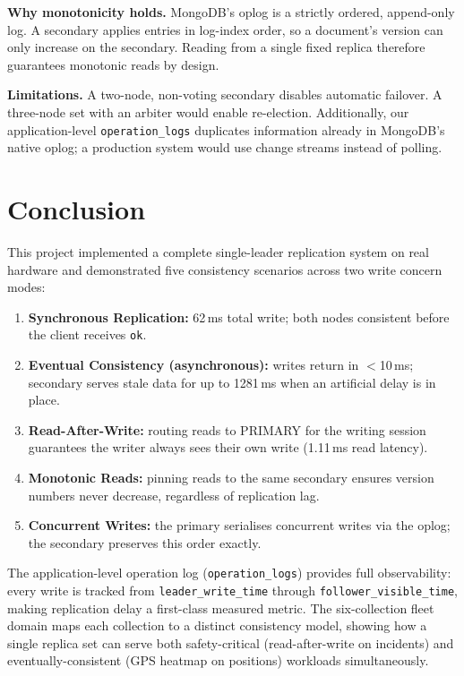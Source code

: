 \documentclass[12pt,a4paper]{article}
\newcommand{\code}[1]{\texttt{\small #1}}
\begin{document}
\textbf{Why monotonicity holds.}
MongoDB's oplog is a strictly ordered, append-only log. A secondary applies entries in
log-index order, so a document's version can only increase on the secondary. Reading
from a single fixed replica therefore guarantees monotonic reads by design.

\textbf{Limitations.}
A two-node, non-voting secondary disables automatic failover. A three-node set with an
arbiter would enable re-election. Additionally, our application-level \code{operation\_logs}
duplicates information already in MongoDB's native oplog; a production system would use
change streams instead of polling.

\section{Conclusion}

This project implemented a complete single-leader replication system on real hardware and
demonstrated five consistency scenarios across two write concern modes:

\begin{enumerate}
  \item \textbf{Synchronous Replication:} 62\,ms total write; both nodes consistent
        before the client receives \code{ok}.
  \item \textbf{Eventual Consistency (asynchronous):} writes return in $<$10\,ms; secondary
        serves stale data for up to 1281\,ms when an artificial delay is in place.
  \item \textbf{Read-After-Write:} routing reads to PRIMARY for the writing session
        guarantees the writer always sees their own write (1.11\,ms read latency).
  \item \textbf{Monotonic Reads:} pinning reads to the same secondary ensures version
        numbers never decrease, regardless of replication lag.
  \item \textbf{Concurrent Writes:} the primary serialises concurrent writes via the
        oplog; the secondary preserves this order exactly.
\end{enumerate}

The application-level operation log (\code{operation\_logs}) provides full observability:
every write is tracked from \code{leader\_write\_time} through
\code{follower\_visible\_time}, making replication delay a first-class measured metric.
The six-collection fleet domain maps each collection to a distinct consistency model,
showing how a single replica set can serve both safety-critical (read-after-write on
incidents) and eventually-consistent (GPS heatmap on positions) workloads simultaneously.
\end{document}
